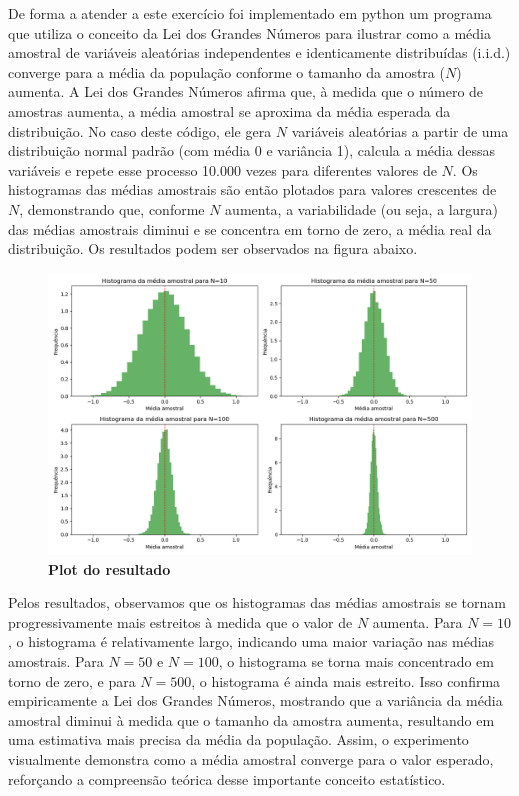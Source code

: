 \begin{enumerate}[label=E\arabic*]
De forma a atender a este exercício foi implementado em python um programa que utiliza o conceito da Lei dos Grandes Números para ilustrar como a média amostral de variáveis aleatórias independentes e identicamente distribuídas (i.i.d.) converge para a média da população conforme o tamanho da amostra ($N$) aumenta. A Lei dos Grandes Números afirma que, à medida que o número de amostras aumenta, a média amostral se aproxima da média esperada da distribuição. No caso deste código, ele gera $N$ variáveis aleatórias a partir de uma distribuição normal padrão (com média 0 e variância 1), calcula a média dessas variáveis e repete esse processo 10.000 vezes para diferentes valores de $N$. Os histogramas das médias amostrais são então plotados para valores crescentes de $N$, demonstrando que, conforme $N$ aumenta, a variabilidade (ou seja, a largura) das médias amostrais diminui e se concentra em torno de zero, a média real da distribuição. Os resultados podem ser observados na figura abaixo.

\begin{figure}[H]
    \caption{\textbf{Plot do resultado}}
       \centering
       \includegraphics[width=\textwidth]{ex3.png}
\end{figure}


Pelos resultados, observamos que os histogramas das médias amostrais se tornam progressivamente mais estreitos à medida que o valor de $N$ aumenta. Para $N = 10$, o histograma é relativamente largo, indicando uma maior variação nas médias amostrais. Para $N = 50$ e $N = 100$, o histograma se torna mais concentrado em torno de zero, e para $N = 500$, o histograma é ainda mais estreito. Isso confirma empiricamente a Lei dos Grandes Números, mostrando que a variância da média amostral diminui à medida que o tamanho da amostra aumenta, resultando em uma estimativa mais precisa da média da população. Assim, o experimento visualmente demonstra como a média amostral converge para o valor esperado, reforçando a compreensão teórica desse importante conceito estatístico.




\end{enumerate}

